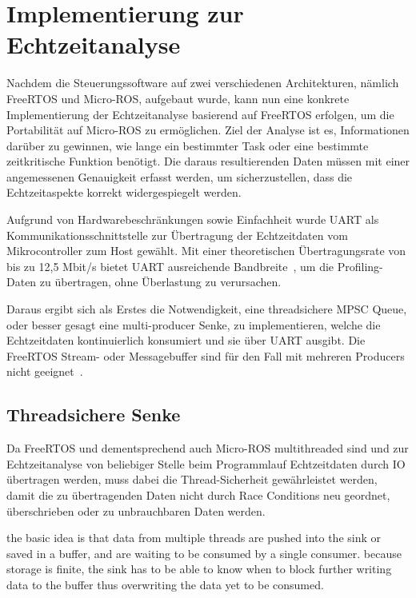 \section{Implementierung zur Echtzeitanalyse}

Nachdem die Steuerungssoftware auf zwei verschiedenen Architekturen, nämlich
FreeRTOS und Micro-ROS, aufgebaut wurde, kann nun eine konkrete Implementierung
der Echtzeitanalyse basierend auf FreeRTOS erfolgen, um die Portabilität auf
Micro-ROS zu ermöglichen. Ziel der Analyse ist es, Informationen darüber zu
gewinnen, wie lange ein bestimmter Task oder eine bestimmte zeitkritische
Funktion benötigt. Die daraus resultierenden Daten müssen mit einer angemessenen
Genauigkeit erfasst werden, um sicherzustellen, dass die Echtzeitaspekte korrekt
widergespiegelt werden.

Aufgrund von Hardwarebeschränkungen sowie Einfachheit wurde UART als
Kommunikationsschnittstelle zur Übertragung der Echtzeitdaten vom
Mikrocontroller zum Host gewählt. Mit einer theoretischen Übertragungsrate von
bis zu 12,5 Mbit/s bietet UART ausreichende Bandbreite~\cite[S.
2]{stm32_datasheet}, um die Profiling-Daten zu übertragen, ohne Überlastung zu
verursachen.

Daraus ergibt sich als Erstes die Notwendigkeit, eine threadsichere \ac{MPSC}
Queue, oder besser gesagt eine multi-producer Senke, zu implementieren, welche
die Echtzeitdaten kontinuierlich konsumiert und sie über UART ausgibt. Die
FreeRTOS Stream- oder Messagebuffer sind für den Fall mit mehreren Producers
nicht geeignet~\cite{FreeRTOSStreamBuffer}.

\subsection{Threadsichere Senke}

Da FreeRTOS und dementsprechend auch Micro-ROS multithreaded sind und zur
Echtzeitanalyse von beliebiger Stelle beim Programmlauf Echtzeitdaten durch IO
übertragen werden, muss dabei die Thread-Sicherheit gewährleistet werden, damit
die zu übertragenden Daten nicht durch Race Conditions neu geordnet,
überschrieben oder zu unbrauchbaren Daten werden.

the basic idea is that data from multiple threads are pushed into the sink or
saved in a buffer, and are waiting to be consumed by a single consumer. because
storage is finite, the sink has to be able to know when to block further writing
data to the buffer thus overwriting the data yet to be consumed.


